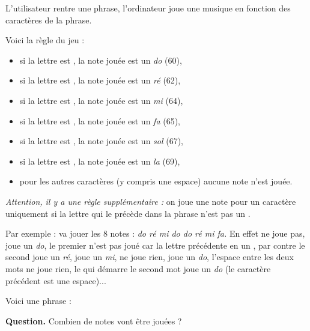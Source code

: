 \documentclass[class=report,crop=false, 12pt]{standalone}
\begin{document}
\begin{enigme}

L'utilisateur rentre une phrase, l'ordinateur joue une musique en fonction des caractères de la phrase.

\medskip

Voici la règle du jeu :
\begin{itemize}
  \item si la lettre est , la note jouée est un \emph{do} (60),
  \item si la lettre est , la note jouée est un \emph{ré} (62), 
  \item si la lettre est , la note jouée est un \emph{mi} (64),
  \item si la lettre est , la note jouée est un \emph{fa} (65),   
  \item si la lettre est , la note jouée est un \emph{sol} (67),
  \item si la lettre est , la note jouée est un \emph{la} (69),
  \item pour les autres caractères (y compris une espace) aucune note n'est jouée.    
\end{itemize}

\medskip

\emph{Attention, il y a une règle supplémentaire :} on joue une note pour un caractère uniquement si la lettre qui le précède dans la phrase n'est pas un .

\bigskip

Par exemple :  va jouer les 8 notes : \emph{do ré mi do do ré mi fa.} En effet
 ne joue pas,  joue un \emph{do},
le premier  n'est pas joué car la lettre précédente en un , par contre le second  joue un \emph{ré},  joue un \emph{mi},
 ne joue rien,  joue un \emph{do}, l'espace entre les deux mots ne joue rien, le  qui démarre le second mot joue un \emph{do} (le caractère précédent est une espace)...


\bigskip

Voici une phrase :
\begin{center}
\begin{minipage}{0.8\textwidth}
\center
{}
\end{minipage}
\end{center}


\textbf{Question.} Combien de notes vont être jouées ?


\end{enigme}
\end{document}

